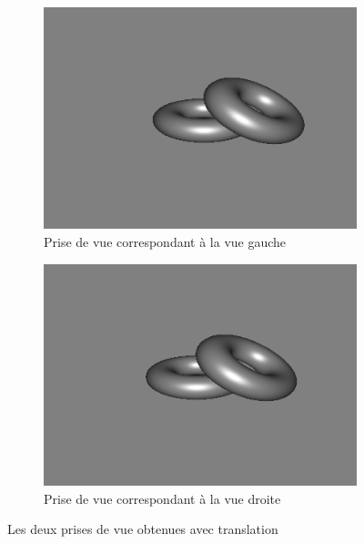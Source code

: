 \documentclass{beamer}
\begin{document}
\begin{frame}
\begin{figure}
\centering
\begin{subfigure}{.5\textwidth}
  \centering
  \includegraphics[width=.8\linewidth]{gauche.png}
  \caption{Prise de vue correspondant à la vue gauche}
\end{subfigure}%
\begin{subfigure}{.5\textwidth}
  \centering
  \includegraphics[width=.8\linewidth]{droite.png}
  \caption{Prise de vue correspondant à la vue droite}
\end{subfigure}
\caption{Les deux prises de vue obtenues avec translation}
\end{figure}

	\end{frame}
%
\end{document}
